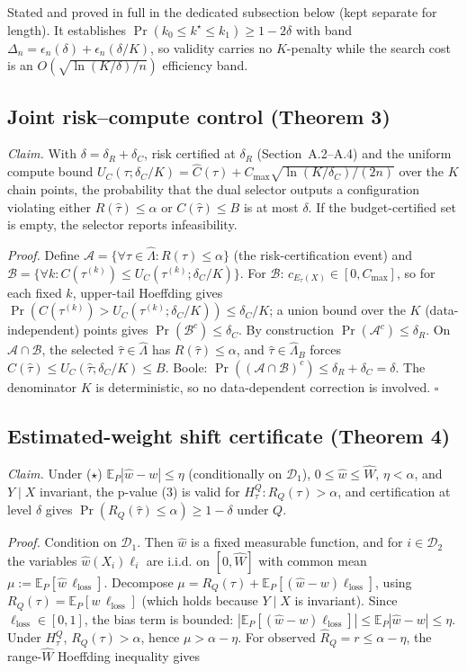 \documentclass{ieeeaccess}
\begin{document}
Stated and proved in full in the dedicated subsection below (kept separate for length). It establishes $\Pr(k_0\le k^\star\le k_1)\ge1-2\delta$ with band $\Delta_n=\epsilon_n(\delta)+\epsilon_n(\delta/K)$, so validity carries no $K$-penalty while the search cost is an $O(\sqrt{\ln(K/\delta)/n})$ efficiency band.

\subsection{Joint risk--compute control (Theorem 3)}

\emph{Claim.} With $\delta=\delta_R+\delta_C$, risk certified at $\delta_R$ (Section~A.2--A.4) and the uniform compute bound $U_C(\tau;\delta_C/K)=\hat C(\tau)+C_{\max}\sqrt{\ln(K/\delta_C)/(2n)}$ over the $K$ chain points, the probability that the dual selector outputs a configuration violating either $R(\hat\tau)\le\alpha$ or $C(\hat\tau)\le B$ is at most $\delta$. If the budget-certified set is empty, the selector reports infeasibility.

\emph{Proof.} Define $\mathcal A=\{\forall\tau\in\hat\Lambda:R(\tau)\le\alpha\}$ (the risk-certification event) and $\mathcal B=\{\forall k:C(\tau^{(k)})\le U_C(\tau^{(k)};\delta_C/K)\}$. For $\mathcal B$: $c_{E_\tau(X)}\in[0,C_{\max}]$, so for each fixed $k$, upper-tail Hoeffding gives $\Pr(C(\tau^{(k)})>U_C(\tau^{(k)};\delta_C/K))\le\delta_C/K$; a union bound over the $K$ (data-independent) points gives $\Pr(\mathcal B^c)\le\delta_C$. By construction $\Pr(\mathcal A^c)\le\delta_R$. On $\mathcal A\cap\mathcal B$, the selected $\hat\tau\in\hat\Lambda$ has $R(\hat\tau)\le\alpha$, and $\hat\tau\in\hat\Lambda_B$ forces $C(\hat\tau)\le U_C(\hat\tau;\delta_C/K)\le B$. Boole: $\Pr((\mathcal A\cap\mathcal B)^c)\le\delta_R+\delta_C=\delta$. The denominator $K$ is deterministic, so no data-dependent correction is involved. $\square$

\subsection{Estimated-weight shift certificate (Theorem 4)}

\emph{Claim.} Under ($\star$) $\mathbb E_P|\hat w-w|\le\eta$ (conditionally on $\mathcal D_1$), $0\le\hat w\le\hat W$, $\eta<\alpha$, and $Y\mid X$ invariant, the p-value (3) is valid for $H^Q_\tau:R_Q(\tau)>\alpha$, and certification at level $\delta$ gives $\Pr(R_Q(\hat\tau)\le\alpha)\ge1-\delta$ under $Q$.

\emph{Proof.} Condition on $\mathcal D_1$. Then $\hat w$ is a fixed measurable function, and for $i\in\mathcal D_2$ the variables $\hat w(X_i)\ell_i$ are i.i.d. on $[0,\hat W]$ with common mean $\mu:=\mathbb E_P[\hat w\,\ell_{\mathrm{loss}}]$. Decompose $\mu=R_Q(\tau)+\mathbb E_P[(\hat w-w)\ell_{\mathrm{loss}}]$, using $R_Q(\tau)=\mathbb E_P[w\,\ell_{\mathrm{loss}}]$ (which holds because $Y\mid X$ is invariant). Since $\ell_{\mathrm{loss}}\in[0,1]$, the bias term is bounded: $|\mathbb E_P[(\hat w-w)\ell_{\mathrm{loss}}]|\le\mathbb E_P|\hat w-w|\le\eta$. Under $H^Q_\tau$, $R_Q(\tau)>\alpha$, hence $\mu>\alpha-\eta$. For observed $\hat R_Q=r\le\alpha-\eta$, the range-$\hat W$ Hoeffding inequality gives
\end{document}
